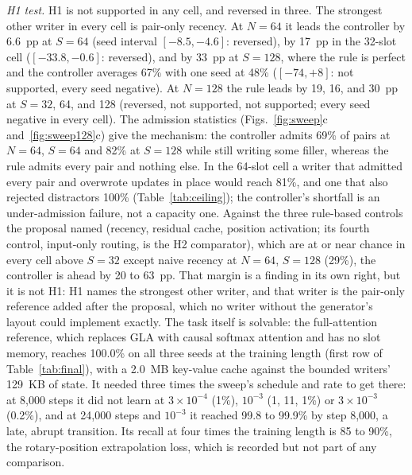 \documentclass[conference]{IEEEtran}
\begin{document}
\textit{H1 test.} H1 is not supported in any cell, and reversed in three. The
strongest other writer in every cell is pair-only recency. At $N = 64$ it leads
the controller by 6.6~pp at $S = 64$ (seed interval $[-8.5, -4.6]$: reversed),
by 17~pp in the 32-slot cell ($[-33.8, -0.6]$: reversed), and by 33~pp at
$S = 128$, where the rule is perfect and the controller averages 67\% with one
seed at 48\% ($[-74, +8]$: not supported, every seed negative). At $N = 128$
the rule leads by 19, 16, and 30~pp at $S = 32$, 64, and 128 (reversed, not
supported, not supported; every seed negative in every cell). The admission
statistics (Figs.~\ref{fig:sweep}c and~\ref{fig:sweep128}c) give the
mechanism: the controller admits 69\% of pairs at $N = 64$, $S = 64$ and 82\%
at $S = 128$ while still writing some filler, whereas the rule admits every
pair and nothing else. In the 64-slot cell a writer that admitted every pair
and overwrote updates in place would reach 81\%, and one that also rejected
distractors 100\% (Table~\ref{tab:ceiling}); the controller's shortfall is an
under-admission failure, not a capacity one. Against the three rule-based
controls the proposal named (recency, residual cache, position activation;
its fourth control, input-only routing, is the H2 comparator), which are at or
near chance in every cell above $S = 32$ except naive recency at $N = 64$,
$S = 128$ (29\%), the controller is ahead by 20 to 63~pp. That margin is a
finding in its own right, but it is not H1: H1 names the strongest other
writer, and that writer is the pair-only reference added after the proposal,
which no writer without the generator's layout could implement exactly. The
task itself is solvable: the full-attention reference, which replaces GLA
with causal softmax attention and has no slot memory, reaches 100.0\% on all
three seeds at the training length (first row of Table~\ref{tab:final}), with
a 2.0~MB key-value cache against the bounded writers' 129~KB of state. It
needed three times the sweep's schedule and rate to get there: at 8{,}000
steps it did not learn at $3 \times 10^{-4}$ (1\%), $10^{-3}$ (1, 11, 1\%) or
$3 \times 10^{-3}$ (0.2\%), and at 24{,}000 steps and $10^{-3}$ it reached
99.8 to 99.9\% by step 8{,}000, a late, abrupt transition. Its recall at four times
the training length is 85 to 90\%, the rotary-position extrapolation loss,
which is recorded but not part of any comparison.
\end{document}
